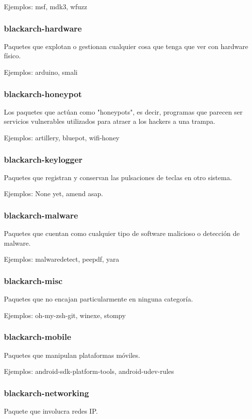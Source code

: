 \documentclass[a4paper, oneside, 11pt]{book}
\begin{document}
Ejemplos: msf, mdk3, wfuzz

\subsubsection{blackarch-hardware}
Paquetes que explotan o gestionan cualquier cosa que tenga que ver con
hardware f\'isico.

Ejemplos: arduino, smali

\subsubsection{blackarch-honeypot}
Los paquetes que act\'uan como "honeypots", es decir, programas que parecen
ser servicios vulnerables utilizados para atraer a los hackers a una trampa.

Ejemplos: artillery, bluepot, wifi-honey

\subsubsection{blackarch-keylogger}
Paquetes que registran y conservan las pulsaciones de teclas en otro sistema.

Ejemplos: None yet, amend asap.

\subsubsection{blackarch-malware}
Paquetes que cuentan como cualquier tipo de software malicioso o
detecci\'on de malware.

Ejemplos: malwaredetect, peepdf, yara

\subsubsection{blackarch-misc}
Paquetes que no encajan particularmente en ninguna categor\'ia.

Ejemplos: oh-my-zsh-git, winexe, stompy

\subsubsection{blackarch-mobile}
Paquetes que manipulan plataformas m\'oviles.

Ejemplos: android-sdk-platform-tools, android-udev-rules

\subsubsection{blackarch-networking}
Paquete que involucra redes IP.
\end{document}
